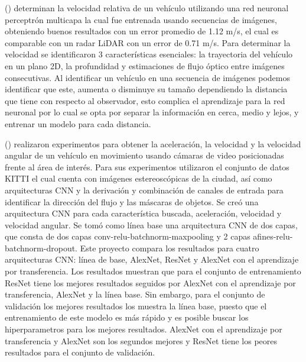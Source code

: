 \citeauthor{kampelmuhler2018Camera} (\cite{kampelmuhler2018Camera}) determinan la velocidad relativa de un vehículo utilizando una red neuronal perceptrón multicapa la cual fue entrenada usando secuencias de imágenes, obteniendo buenos resultados con un error promedio de 1.12 m/s, el cual es comparable con un radar  LiDAR con un error de 0.71 m/s. Para determinar la velocidad se identificaron 3 características esenciales: la trayectoria del vehículo en un plano 2D, la profundidad y estimaciones de flujo óptico entre imágenes consecutivas. Al identificar un vehículo en una secuencia de imágenes podemos identificar que este, aumenta o disminuye su tamaño dependiendo la distancia que tiene con respecto al observador, esto complica el aprendizaje para la red neuronal por lo cual se opta por separar la información en cerca, medio y lejos, y entrenar un modelo para cada distancia. 

\citeauthor{zhang2017Vehicle} (\cite{zhang2017Vehicle}) realizaron experimentos para obtener la aceleración, la velocidad y la velocidad angular de un vehículo en movimiento usando cámaras de video posicionadas frente al área de interés. Para sus experimentos utilizaron el conjunto de datos KITTI el cual cuenta con imágenes estereoscópicas de la ciudad, así como arquitecturas CNN y la derivación y combinación de canales de entrada para identificar la dirección del flujo y las máscaras de objetos. Se creó una arquitectura CNN para cada característica buscada, aceleración, velocidad y velocidad angular. Se tomó como línea base una arquitectura CNN de dos capas, que consta de dos capas conv-relu-batchnorm-maxpooling y 2 capas afines-relu-batchnorm-dropout. Este proyecto compara los resultados para cuatro arquitecturas CNN: línea de base, AlexNet, ResNet y AlexNet con el aprendizaje por transferencia.  Los resultados muestran que para el conjunto de entrenamiento ResNet tiene los mejores resultados seguidos por AlexNet con el aprendizaje por transferencia, AlexNet y la línea base. Sin embargo, para el conjunto de validación los mejores resultados los muestra la línea base, puesto que el entrenamiento de este modelo es más rápido y es posible buscar los hiperparametros para los mejores resultados. AlexNet con el aprendizaje por transferencia y AlexNet son los segundos mejores y ResNet tiene los peores resultados para el conjunto de validación. 

